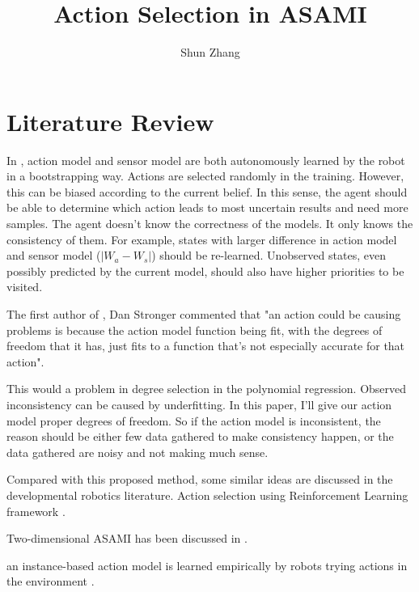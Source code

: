 \documentclass[10pt]{article}
\title{Action Selection in ASAMI}
\author{Shun Zhang}
\date{}
\begin{document}
\maketitle


\sloppy
\section{Literature Review}

In \cite{CSJ06}, action model and sensor model are both autonomously
learned by the robot in a bootstrapping way. Actions are selected
randomly in the training. However, this can be biased according to the
current belief.  In this sense, the agent should be able to determine
which action leads to most uncertain results and need more samples.
The agent doesn't know the correctness of the models. It only
knows the consistency of them. For example, states with larger
difference in action model and sensor model ($|W_a - W_s|$) should be
re-learned.  Unobserved states, even possibly predicted by the current
model, should also have higher priorities to be visited.

The first author of \cite{CSJ06}, Dan Stronger commented that "an
action could be causing problems is because the action model function
being fit, with the degrees of freedom that it has, just fits to a
function that's not especially accurate for that action".

This would a problem in degree selection in the polynomial regression.
Observed inconsistency can be caused by underfitting.  In this paper,
I'll give our action model proper degrees of freedom. So if the action
model is inconsistent, the reason should be either few data gathered
to make consistency happen, or the data gathered are noisy and not
making much sense.

Compared with this proposed method, some similar ideas are discussed
in the developmental robotics literature. Action selection using
Reinforcement Learning framework \cite{oudeyer2006discovering}
\cite{schmidhuber2006developmental}.


Two-dimensional ASAMI has been discussed in \cite{ICRA08-stronger}.

an instance-based action model is learned empirically by robots trying
actions in the environment \cite{LNAI2007-ahmadi}.




\end{document}
